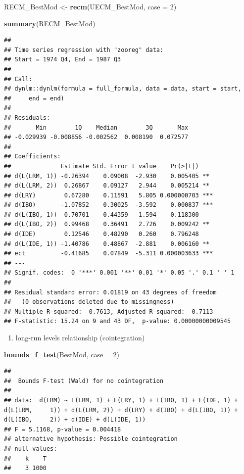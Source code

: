 \documentclass[
]{book}
\newenvironment{Shaded}{\begin{snugshade}}{\end{snugshade}}
\newcommand{\AttributeTok}[1]{\textcolor[rgb]{0.13,0.29,0.53}{#1}}
\newcommand{\DecValTok}[1]{\textcolor[rgb]{0.00,0.00,0.81}{#1}}
\newcommand{\FunctionTok}[1]{\textcolor[rgb]{0.13,0.29,0.53}{\textbf{#1}}}
\newcommand{\NormalTok}[1]{#1}
\newcommand{\OtherTok}[1]{\textcolor[rgb]{0.56,0.35,0.01}{#1}}
\providecommand{\tightlist}{%
  \setlength{\itemsep}{0pt}\setlength{\parskip}{0pt}}
\begin{document}
\begin{Shaded}
\begin{Highlighting}[]
\NormalTok{RECM\_BestMod }\OtherTok{\textless{}{-}} \FunctionTok{recm}\NormalTok{(UECM\_BestMod, }\AttributeTok{case =} \DecValTok{2}\NormalTok{)}

\FunctionTok{summary}\NormalTok{(RECM\_BestMod)}
\end{Highlighting}
\end{Shaded}

\begin{verbatim}
## 
## Time series regression with "zooreg" data:
## Start = 1974 Q4, End = 1987 Q3
## 
## Call:
## dynlm::dynlm(formula = full_formula, data = data, start = start, 
##     end = end)
## 
## Residuals:
##       Min        1Q    Median        3Q       Max 
## -0.029939 -0.008856 -0.002562  0.008190  0.072577 
## 
## Coefficients:
##              Estimate Std. Error t value    Pr(>|t|)    
## d(L(LRM, 1)) -0.26394    0.09008  -2.930    0.005405 ** 
## d(L(LRM, 2))  0.26867    0.09127   2.944    0.005214 ** 
## d(LRY)        0.67280    0.11591   5.805 0.000000703 ***
## d(IBO)       -1.07852    0.30025  -3.592    0.000837 ***
## d(L(IBO, 1))  0.70701    0.44359   1.594    0.118300    
## d(L(IBO, 2))  0.99468    0.36491   2.726    0.009242 ** 
## d(IDE)        0.12546    0.48290   0.260    0.796248    
## d(L(IDE, 1)) -1.40786    0.48867  -2.881    0.006160 ** 
## ect          -0.41685    0.07849  -5.311 0.000003633 ***
## ---
## Signif. codes:  0 '***' 0.001 '**' 0.01 '*' 0.05 '.' 0.1 ' ' 1
## 
## Residual standard error: 0.01819 on 43 degrees of freedom
##   (0 observations deleted due to missingness)
## Multiple R-squared:  0.7613, Adjusted R-squared:  0.7113 
## F-statistic: 15.24 on 9 and 43 DF,  p-value: 0.00000000009545
\end{verbatim}

\begin{enumerate}
\def\labelenumi{\arabic{enumi}.}
\setcounter{enumi}{3}
\tightlist
\item
  long-run levels relationship (cointegration)
\end{enumerate}

\begin{Shaded}
\begin{Highlighting}[]
\FunctionTok{bounds\_f\_test}\NormalTok{(BestMod, }\AttributeTok{case =} \DecValTok{2}\NormalTok{)}
\end{Highlighting}
\end{Shaded}

\begin{verbatim}
## 
##  Bounds F-test (Wald) for no cointegration
## 
## data:  d(LRM) ~ L(LRM, 1) + L(LRY, 1) + L(IBO, 1) + L(IDE, 1) + d(L(LRM,     1)) + d(L(LRM, 2)) + d(LRY) + d(IBO) + d(L(IBO, 1)) + d(L(IBO,     2)) + d(IDE) + d(L(IDE, 1))
## F = 5.1168, p-value = 0.004418
## alternative hypothesis: Possible cointegration
## null values:
##    k    T 
##    3 1000
\end{verbatim}
\end{document}
